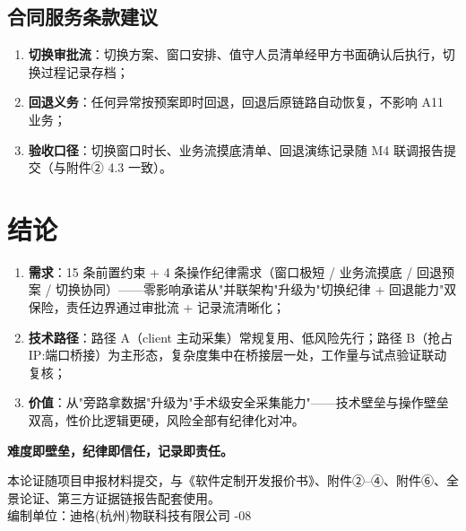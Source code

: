 \documentclass[11pt,a4paper]{ctexart}
\begin{document}
\subsection{合同服务条款建议}

\begin{enumerate}[leftmargin=*]
  \item \textbf{切换审批流}：切换方案、窗口安排、值守人员清单经甲方书面确认后执行，切换过程记录存档；
  \item \textbf{回退义务}：任何异常按预案即时回退，回退后原链路自动恢复，不影响 A11 业务；
  \item \textbf{验收口径}：切换窗口时长、业务流摸底清单、回退演练记录随 M4 联调报告提交（与附件② 4.3 一致）。
\end{enumerate}

\section{结论}

\begin{enumerate}[leftmargin=*]
  \item \textbf{需求}：15 条前置约束 + 4 条操作纪律需求（窗口极短 / 业务流摸底 / 回退预案 / 切换协同）——零影响承诺从"并联架构"升级为"切换纪律 + 回退能力"双保险，责任边界通过审批流 + 记录流清晰化；
  \item \textbf{技术路径}：路径 A（client 主动采集）常规复用、低风险先行；路径 B（抢占 IP:端口桥接）为主形态，复杂度集中在桥接层一处，工作量与试点验证联动复核；
  \item \textbf{价值}：从"旁路拿数据"升级为"手术级安全采集能力"——技术壁垒与操作壁垒双高，性价比逻辑更硬，风险全部有纪律化对冲。
\end{enumerate}

\begin{center}
\large\textbf{难度即壁垒，纪律即信任，记录即责任。}
\end{center}

\vspace{1em}
\noindent\hrulefill

\begin{center}
\small 本论证随项目申报材料提交，与《软件定制开发报价书》、附件②--④、附件⑥、全景论证、第三方证据链报告配套使用。\\
编制单位：迪格(杭州)物联科技有限公司 -08
\end{center}
\end{document}
